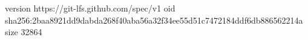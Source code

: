 version https://git-lfs.github.com/spec/v1
oid sha256:2baa8921dd9dabda268f40aba56a32f34ee55d51c7472184ddf6db886562214a
size 32864
